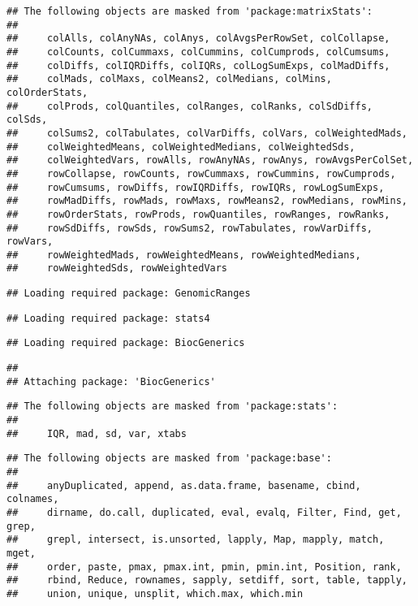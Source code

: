 \documentclass[
  oneside]{book}
\begin{document}
\begin{verbatim}
## The following objects are masked from 'package:matrixStats':
## 
##     colAlls, colAnyNAs, colAnys, colAvgsPerRowSet, colCollapse,
##     colCounts, colCummaxs, colCummins, colCumprods, colCumsums,
##     colDiffs, colIQRDiffs, colIQRs, colLogSumExps, colMadDiffs,
##     colMads, colMaxs, colMeans2, colMedians, colMins, colOrderStats,
##     colProds, colQuantiles, colRanges, colRanks, colSdDiffs, colSds,
##     colSums2, colTabulates, colVarDiffs, colVars, colWeightedMads,
##     colWeightedMeans, colWeightedMedians, colWeightedSds,
##     colWeightedVars, rowAlls, rowAnyNAs, rowAnys, rowAvgsPerColSet,
##     rowCollapse, rowCounts, rowCummaxs, rowCummins, rowCumprods,
##     rowCumsums, rowDiffs, rowIQRDiffs, rowIQRs, rowLogSumExps,
##     rowMadDiffs, rowMads, rowMaxs, rowMeans2, rowMedians, rowMins,
##     rowOrderStats, rowProds, rowQuantiles, rowRanges, rowRanks,
##     rowSdDiffs, rowSds, rowSums2, rowTabulates, rowVarDiffs, rowVars,
##     rowWeightedMads, rowWeightedMeans, rowWeightedMedians,
##     rowWeightedSds, rowWeightedVars
\end{verbatim}

\begin{verbatim}
## Loading required package: GenomicRanges
\end{verbatim}

\begin{verbatim}
## Loading required package: stats4
\end{verbatim}

\begin{verbatim}
## Loading required package: BiocGenerics
\end{verbatim}

\begin{verbatim}
## 
## Attaching package: 'BiocGenerics'
\end{verbatim}

\begin{verbatim}
## The following objects are masked from 'package:stats':
## 
##     IQR, mad, sd, var, xtabs
\end{verbatim}

\begin{verbatim}
## The following objects are masked from 'package:base':
## 
##     anyDuplicated, append, as.data.frame, basename, cbind, colnames,
##     dirname, do.call, duplicated, eval, evalq, Filter, Find, get, grep,
##     grepl, intersect, is.unsorted, lapply, Map, mapply, match, mget,
##     order, paste, pmax, pmax.int, pmin, pmin.int, Position, rank,
##     rbind, Reduce, rownames, sapply, setdiff, sort, table, tapply,
##     union, unique, unsplit, which.max, which.min
\end{verbatim}
\end{document}
